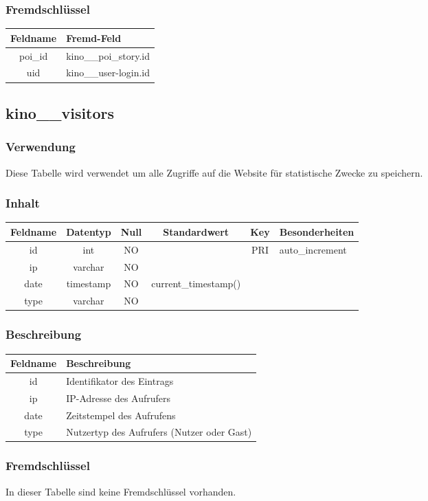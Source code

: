 \subsubsection{Fremdschlüssel}
\begin{table}[H]
	\begin{tabular}{|c|p{12.5cm}|}
		\hline
		\textbf{Feldname} & \textbf{Fremd-Feld} \\ \hline
		poi\_id & kino\_\_poi\_story.id \\ \hline
		uid & kino\_\_user-login.id \\ \hline
	\end{tabular}
\end{table}
\subsection{kino\_\_visitors}
\subsubsection{Verwendung}  Diese Tabelle wird verwendet um alle Zugriffe auf die Website für statistische Zwecke zu speichern.
\subsubsection{Inhalt}
\begin{table}[H]
	\begin{tabular}{|c|c|c|c|c|p{3.5cm}|}
		\hline
		\textbf{Feldname} & \textbf{Datentyp} & \textbf{Null} & \textbf{Standardwert} & \textbf{Key}   & \textbf{Besonderheiten} \\ \hline
		id & int & NO &  & PRI & auto\_increment \\ \hline
		ip & varchar & NO &  &  & \\ \hline
		date & timestamp & NO & current\_timestamp() &  & \\ \hline
		type & varchar & NO &  &  & \\ \hline
	\end{tabular}
\end{table}
\subsubsection{Beschreibung}
\begin{table}[H]
	\begin{tabular}{|c|p{12cm}|}
		\hline
		\textbf{Feldname} & \textbf{Beschreibung} \\ \hline
		id & Identifikator des Eintrags \\ \hline
		ip & IP-Adresse des Aufrufers \\ \hline
		date & Zeitstempel des Aufrufens \\ \hline
		type & Nutzertyp des Aufrufers (Nutzer oder Gast) \\ \hline
	\end{tabular}
\end{table}
\subsubsection{Fremdschlüssel}
In dieser Tabelle sind keine Fremdschlüssel vorhanden.